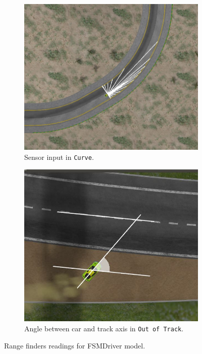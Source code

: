\newcommand{\state}[1]{\texttt{#1}}%
\newcommand{\racing}{\state{Racing}}%
\newcommand{\recovery}{\state{Recovery}}%
\newcommand{\SL}{\state{Straight Line}}%
\newcommand{\C}{\state{Curve}}%
\newcommand{\OT}{\state{Out of Track}}%
\newcommand{\St}{\state{Stuck}}%
\newcommand{\AC}{\state{Approaching Curve}}%
\newcommand{\IT}{\state{Inside Track}}%

\begin{figure}[t]
\centering
\begin{subfigure}[b]{0.4\textwidth}
	\centering%
	\includegraphics[height=.8\textwidth]{img/FarthestSensor}
	\caption{Sensor input in \C.}\label{fig:FSensor}%
\end{subfigure}\hfill
\begin{subfigure}[b]{0.4\textwidth}
		\centering
		\includegraphics[height=.8\textwidth]{img/ReturnAngle}
		\caption{Angle between car and track axis in \OT.}\label{fig:Angle}%
\end{subfigure}
   \caption{Range finders readings for FSMDriver model.}\label{fig:FSMDriver}
\end{figure}

